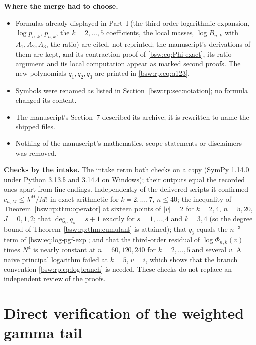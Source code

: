 \documentclass[11pt,letterpaper]{article}
\theoremstyle{definition}
\theoremstyle{remark}
\begin{document}
\textbf{Where the merge had to choose.}
\begin{itemize}[leftmargin=2em]
\item Formulas already displayed in Part~I (the third-order logarithmic
 expansion, $\log p_{n,k}$, $p_{n,k}$, the $k=2,\ldots,5$ coefficients, the
 local masses, $\log B_{n,k}$ with $A_1,A_2,A_3$, the ratio) are cited, not
 reprinted; the manuscript's derivations of them are kept, and its
 contraction proof of \eqref{bsw:eq:Phi-exact}, its ratio argument and its
 local computation appear as marked second proofs.  The new polynomials
 $q_1,q_2,q_3$ are printed in \eqref{bsw:rp:eq:q123}.
\item Symbols were renamed as listed in Section~\ref{bsw:rp:sec:notation};
 no formula changed its content.
\item The manuscript's Section~7 described its archive; it is rewritten to
 name the shipped files.
\item Nothing of the manuscript's mathematics, scope statements or
 disclaimers was removed.
\end{itemize}

\textbf{Checks by the intake.}  The intake reran both checks on a copy
(SymPy 1.14.0 under Python 3.13.5 and 3.14.4 on Windows); their outputs
equal the recorded ones apart from line endings.  Independently of the delivered scripts it
confirmed $c_{n,M}\le\lambda^M/M!$ in exact arithmetic for $k=2,\ldots,7$,
$n\le40$; the inequality of Theorem~\ref{bsw:rp:thm:operator} at sixteen
points of $|v|=2$ for $k=2,4$, $n=5,20$, $J=0,1,2$; that
$\deg_vq_s=s+1$ exactly for $s=1,\ldots,4$ and $k=3,4$ (so the degree bound
of Theorem~\ref{bsw:rp:thm:cumulant} is attained); that $q_3$ equals the
$n^{-3}$ term of \eqref{bsw:eq:log-pgf-exp}; and that the third-order
residual of $\log\Phi_{n,k}(v)$ times $N^4$ is nearly constant at
$n=60,120,240$ for $k=2,\ldots,5$ and several $v$.  A naive principal
logarithm failed at $k=5$, $v=i$, which shows that the branch convention
\eqref{bsw:rp:eq:logbranch} is needed.  These checks do not replace an
independent review of the proofs.
\par\endgroup

\appendix
\setcounter{section}{0}
\renewcommand{\thesection}{II.\Alph{section}}
\renewcommand{\theHsection}{rpapp.\Alph{section}}
\section{Direct verification of the weighted gamma tail}\label{bsw:rp:app:gamma}
\end{document}
